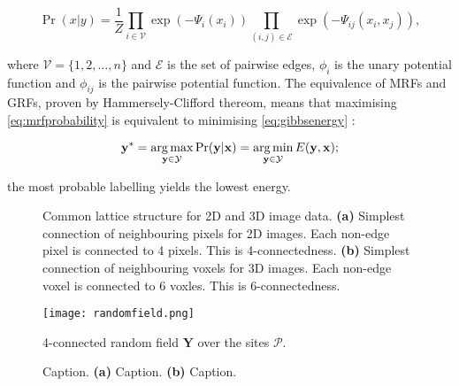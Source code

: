 \begin{equation}
\Pr(x|y) = \frac{1}{Z}\prod_{i \in \mathcal{V}}\exp(-\Psi_i(x_i))\prod_{(i,j) \in \mathcal{E}}\exp(-\Psi_{ij}(x_i,x_j)),
\label{eq:gibbs2}
\end{equation}

where $\mathcal{V} = \{1,2,\ldots,n\}$ and $\mathcal{E}$ is the set of pairwise edges, $\phi_i$ is the unary potential function and $\phi_{ij}$ is the pairwise potential function. The equivalence of MRFs and GRFs, proven by Hammersely-Clifford thereom, means that maximising \autoref{eq:mrfprobability} is equivalent to minimising \autoref{eq:gibbsenergy} \citep{Winkler2006}:

\begin{equation}
	\mathbf{y^*} = \operatorname*{arg\,max}_{\mathbf{y} \in \mathcal{Y}}\Pr(\mathbf{y}|\mathbf{x}) = \operatorname*{arg\,min}_{\mathbf{y} \in \mathcal{Y}}E(\mathbf{y},\mathbf{x});
\end{equation}

the most probable labelling yields the lowest energy.

\begin{figure}[!t]
	\centering
	\caption{Common lattice structure for 2D and 3D image data. \textbf{(a)} Simplest connection of neighbouring pixels for 2D images. Each non-edge pixel is connected to 4 pixels. This is 4-connectedness. \textbf{(b)} Simplest connection of neighbouring voxels for 3D images. Each non-edge voxel is connected to 6 voxles. This is 6-connectedness.}
	\label{fig:connectedness}
\end{figure}

\begin{figure}[!t]
	\centering
	\texttt{[image: randomfield.png]}
	\caption{4-connected random field $\mathbf{Y}$ over the sites $\mathcal{P}$.}
	\label{fig:randomfield}
\end{figure}

\begin{figure}[!t]
	\centering
	\caption{Caption. \textbf{(a)} Caption. \textbf{(b)} Caption.}
	\label{fig:cliques}
\end{figure}

